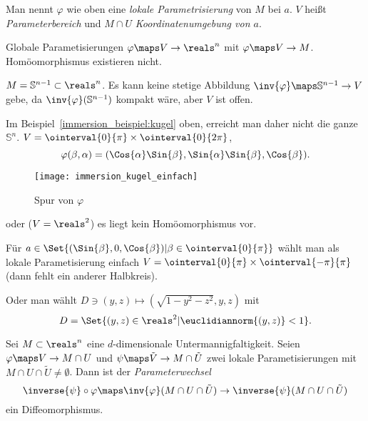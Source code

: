 \begin{bemerkungen*}
  \item Man nennt \( \varphi \) wie oben eine \emph{lokale Parametrisierung} von \( M \) bei \( a \). \( V \) heißt \emph{Parameterbereich} und \( M\cap U \) \emph{Koordinatenumgebung von \( a \)}.
  \item Globale Parametisierungen \( \varphi\maps V\to\reals^n \) mit \( \varphi\maps V\to M \). Homöomorphismus existieren \ia nicht.
  \begin{beispiel*}
    \( M=\mathbb{S}^{n-1}\subset \reals^n \). Es kann keine stetige Abbildung \( \inv{\varphi}\maps \mathbb{S}^{n-1}\to V \) gebe, da \( \inv{\varphi}(\mathbb{S}^{n-1}) \) kompakt wäre, aber \( V \) ist offen.
    
    Im Beispiel~\ref{immersion_beispiel:kugel} oben, erreicht man daher nicht die ganze \( \mathbb{S}^n \). \( V=\ointerval{0}{\pi}\times \ointerval{0}{2\pi} \),
    \begin{equation*}
      \varphi(\beta,\alpha)=(\Cos{\alpha}\Sin{\beta},\Sin{\alpha}\Sin{\beta},\Cos{\beta}).
    \end{equation*}
    \begin{figure}[H]
      \centering
      \texttt{[image: immersion\_kugel\_einfach]}
      \caption*{Spur von \( \varphi \)}
      \label{fig:immersion_kugel_einfach}
    \end{figure}
    oder (\( V=\reals^2 \)) es liegt kein Homöomorphismus vor.

    Für \( a\in \Set{(\Sin{\beta},0,\Cos{\beta})|\beta\in \ointerval{0}{\pi}} \) wählt man als lokale Parametisierung einfach \( V=\ointerval{0}{\pi}\times \ointerval{-\pi}{\pi} \) (dann fehlt ein anderer Halbkreis).

    Oder man wählt \( D\ni (y,z)\mapsto (\sqrt{1-y^2-z^2},y,z) \) mit
    \begin{equation*}
      D=\Set{(y,z)\in \reals^2|\euclidiannorm{(y,z)}<1}.
    \end{equation*}
  \end{beispiel*}
\end{bemerkungen*}
\begin{satz}[Parameterwechsel]\label{parameterwechsel}
  Sei \( M\subset \reals^n \) eine \( d \)-dimensionale Untermannigfaltigkeit. Seien \( \varphi\maps V\to M\cap U \) und \( \psi\maps \tilde{V}\to M\cap \tilde{U} \) zwei lokale Parametisierungen mit \( M\cap U\cap \tilde{U}\neq \emptyset \). Dann ist der \emph{Parameterwechsel}   
  \begin{equation*}
    \inverse{\psi}\circ \varphi\maps \inv{\varphi}(M\cap U\cap \tilde{U})\to \inverse{\psi}(M\cap U\cap \tilde{U})
  \end{equation*}
  ein Diffeomorphismus.
\end{satz}
